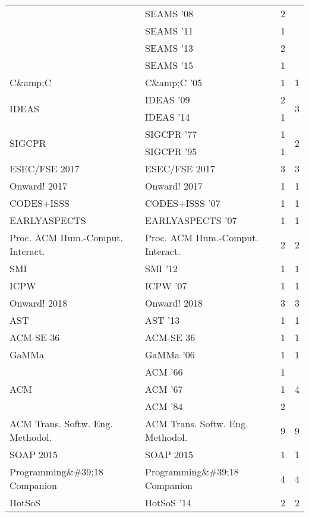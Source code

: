 \begin{table*}[t]
\begin{tabular}{llrr}
& SEAMS '08 & 2 &\\
& SEAMS '11 & 1 &\\
& SEAMS '13 & 2 &\\
& SEAMS '15 & 1 &\\
\multirow{1}{*}{C\&amp;C } & C\&amp;C '05 & 1 & \multirow{1}{*}{1}\\
\multirow{2}{*}{IDEAS } & IDEAS '09 & 2 & \multirow{2}{*}{3}\\
& IDEAS '14 & 1 &\\
\multirow{2}{*}{SIGCPR } & SIGCPR '77 & 1 & \multirow{2}{*}{2}\\
& SIGCPR '95 & 1 &\\
\multirow{1}{*}{ESEC/FSE 2017} & ESEC/FSE 2017 & 3 & \multirow{1}{*}{3}\\
\multirow{1}{*}{Onward! 2017} & Onward! 2017 & 1 & \multirow{1}{*}{1}\\
\multirow{1}{*}{CODES+ISSS } & CODES+ISSS '07 & 1 & \multirow{1}{*}{1}\\
\multirow{1}{*}{EARLYASPECTS } & EARLYASPECTS '07 & 1 & \multirow{1}{*}{1}\\
\multirow{1}{*}{Proc. ACM Hum.-Comput. Interact.} & Proc. ACM Hum.-Comput. Interact. & 2 & \multirow{1}{*}{2}\\
\multirow{1}{*}{SMI } & SMI '12 & 1 & \multirow{1}{*}{1}\\
\multirow{1}{*}{ICPW } & ICPW '07 & 1 & \multirow{1}{*}{1}\\
\multirow{1}{*}{Onward! 2018} & Onward! 2018 & 3 & \multirow{1}{*}{3}\\
\multirow{1}{*}{AST } & AST '13 & 1 & \multirow{1}{*}{1}\\
\multirow{1}{*}{ACM-SE 36} & ACM-SE 36 & 1 & \multirow{1}{*}{1}\\
\multirow{1}{*}{GaMMa } & GaMMa '06 & 1 & \multirow{1}{*}{1}\\
\multirow{3}{*}{ACM } & ACM '66 & 1 & \multirow{3}{*}{4}\\
& ACM '67 & 1 &\\
& ACM '84 & 2 &\\
\multirow{1}{*}{ACM Trans. Softw. Eng. Methodol.} & ACM Trans. Softw. Eng. Methodol. & 9 & \multirow{1}{*}{9}\\
\multirow{1}{*}{SOAP 2015} & SOAP 2015 & 1 & \multirow{1}{*}{1}\\
\multirow{1}{*}{Programming\&\#39;18 Companion} & Programming\&\#39;18 Companion & 4 & \multirow{1}{*}{4}\\
\multirow{1}{*}{HotSoS } & HotSoS '14 & 2 & \multirow{1}{*}{2}\\

\end{tabular}
\end{table*}
